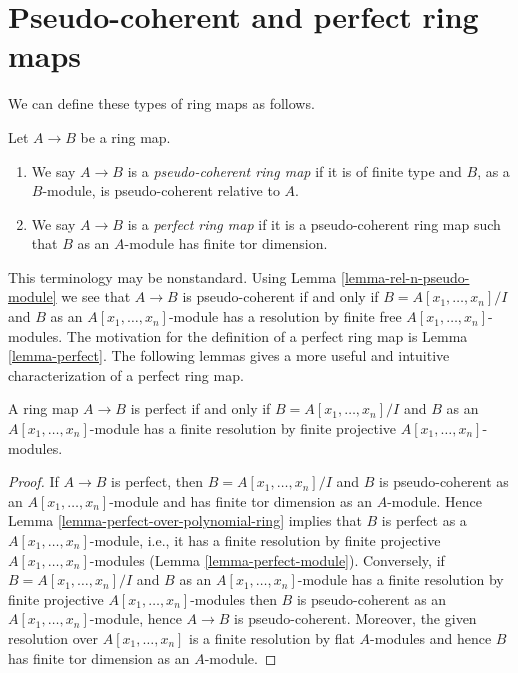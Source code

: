 \section{Pseudo-coherent and perfect ring maps}
\label{section-pseudo-coherent-perfect-ring-map}

\noindent
We can define these types of ring maps as follows.

\begin{definition}
\label{definition-pseudo-coherent-perfect}
Let $A \to B$ be a ring map.
\begin{enumerate}
\item We say $A \to B$ is a {\it pseudo-coherent ring map} if it is of finite
type and $B$, as a $B$-module, is pseudo-coherent relative to $A$.
\item We say $A \to B$ is a {\it perfect ring map} if it is a
pseudo-coherent ring map such that $B$ as an $A$-module has finite
tor dimension.
\end{enumerate}
\end{definition}

\noindent
This terminology may be nonstandard. Using
Lemma \ref{lemma-rel-n-pseudo-module}
we see that $A \to B$ is pseudo-coherent if and only if
$B = A[x_1, \ldots, x_n]/I$ and $B$ as an $A[x_1, \ldots, x_n]$-module
has a resolution by finite free $A[x_1, \ldots, x_n]$-modules.
The motivation for the definition of a perfect ring map is
Lemma \ref{lemma-perfect}.
The following lemmas gives a more useful and intuitive
characterization of a perfect ring map.

\begin{lemma}
\label{lemma-perfect-ring-map}
A ring map $A \to B$ is perfect if and only if $B = A[x_1, \ldots, x_n]/I$
and $B$ as an $A[x_1, \ldots, x_n]$-module has a finite resolution by
finite projective $A[x_1, \ldots, x_n]$-modules.
\end{lemma}

\begin{proof}
If $A \to B$ is perfect, then $B = A[x_1, \ldots, x_n]/I$ and
$B$ is pseudo-coherent as an $A[x_1, \ldots, x_n]$-module and
has finite tor dimension as an $A$-module. Hence
Lemma \ref{lemma-perfect-over-polynomial-ring}
implies that $B$ is perfect as a $A[x_1, \ldots, x_n]$-module, i.e.,
it has a finite resolution by finite projective $A[x_1, \ldots, x_n]$-modules
(Lemma \ref{lemma-perfect-module}).
Conversely, if $B = A[x_1, \ldots, x_n]/I$
and $B$ as an $A[x_1, \ldots, x_n]$-module has a finite resolution by
finite projective $A[x_1, \ldots, x_n]$-modules then
$B$ is pseudo-coherent as an $A[x_1, \ldots, x_n]$-module,
hence $A \to B$ is pseudo-coherent. Moreover, the given resolution
over $A[x_1, \ldots, x_n]$ is a finite resolution by flat 
$A$-modules and hence $B$ has finite tor dimension as an $A$-module.
\end{proof}

